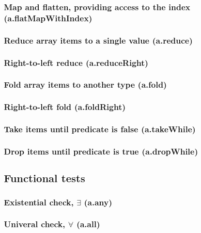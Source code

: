 \documentclass{article}
\theoremstyle{definition}
\begin{document}
\subsubsection{Map and flatten, providing access to the index (a.flatMapWithIndex)}

\subsubsection{Reduce array items to a single value (a.reduce)}

\subsubsection{Right-to-left reduce (a.reduceRight)}

\subsubsection{Fold array items to another type (a.fold)}

\subsubsection{Right-to-left fold (a.foldRight)}

\subsubsection{Take items until predicate is false (a.takeWhile)}

\subsubsection{Drop items until predicate is true (a.dropWhile)}

\subsection{Functional tests}

\subsubsection{Existential check, $\exists$ (a.any)}

\subsubsection{Univeral check, $\forall$ (a.all)}
\end{document}

